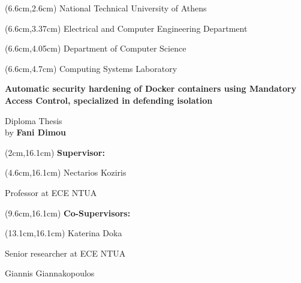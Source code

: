 \begin{mdseries}  
\begin{textblock*}{103cm}(6.6cm,2.6cm) %
\fontsize{16}{12}\selectfont 
National Technical University of Athens
\end{textblock*}
\fontsize{14}{12}\selectfont
\begin{textblock*}{103cm}(6.6cm,3.37cm)
Electrical and Computer Engineering Department
\end{textblock*}
\begin{textblock*}{103cm}(6.6cm,4.05cm)
Department of Computer Science
\end{textblock*}
\begin{textblock*}{103cm}(6.6cm,4.7cm)
Computing Systems Laboratory
\end{textblock*}

\hfill\break\hfill\break\hfill\break\hfill\break\hfill\break\hfill\break\hfill\break\hfill\break

\fontsize{18}{12}\selectfont
\begin{center}\textbf{Automatic security hardening of Docker containers using Mandatory Access Control, specialized in defending isolation}\end{center}
\hfill\break
\fontsize{17}{20.5}\selectfont

\begin{center}
Diploma Thesis
\\
by \textbf{Fani Dimou}
\end{center}

\hfill\break

\hfill\break\hfill\break
\fontsize{13}{12}\selectfont
\begin{textblock*}{103cm}(2cm,16.1cm)
\textbf{Supervisor:} %
\end{textblock*}
\begin{textblock*}{103cm}(4.6cm,16.1cm)
Nectarios Koziris

Professor at ECE NTUA
\end{textblock*}

\fontsize{13}{12}\selectfont
\begin{textblock*}{103cm}(9.6cm,16.1cm)
\textbf{Co-Supervisors:}
\end{textblock*}
\begin{textblock*}{140cm}(13.1cm,16.1cm)
Katerina Doka

Senior researcher at ECE NTUA
\hfill\break

Giannis Giannakopoulos


\end{textblock*}
\end{mdseries}
